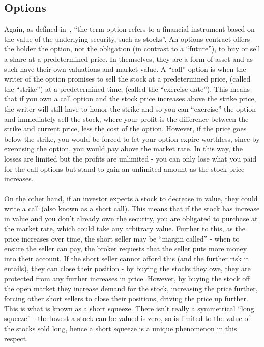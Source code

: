 \documentclass[11pt]{article} %
\begin{document}
\subsection{Options}
Again, as defined in~\cite{options}, ``the term option refers to a 
financial instrument based on the value of the underlying security, 
such as stocks''. An options contract offers the holder the option, 
not the obligation (in contrast to a ``future''), to buy or sell a share 
at a predetermined price. In themselves, they are a form of asset and 
as such have their own valuations and market value. A ``call'' option 
is when the writer of the option promises to sell the stock at a 
predetermined price, (called the ``strike'') at a predetermined time, 
(called the ``exercise date''). This means that if you own a call option and 
the stock price increases above the strike price, the writer will still have 
to honor the strike and so you can ``exercise'' the option 
and immediately sell the stock, where your profit is the difference 
between the strike and current price, less the cost of the option. 
However, if the price goes below the strike, you would be forced 
to let your option expire worthless, since by exercising the option, 
you would pay above the market rate. In this way, the losses are limited 
but the profits are unlimited - you can only lose what you paid for the 
call options but stand to gain an unlimited amount as the stock price 
increases. 
\paragraph{}
On the other hand, if an investor expects a stock to decrease 
in value, they could write a call (also known as a short call). This 
means that if the stock has increase in value and you don't already own 
the security, you are obligated to purchase at the market rate, which 
could take any arbitrary value. Further to this, as the price increases 
over time, the short seller may be ``margin called'' - when to ensure the 
seller can pay, the broker requests that the seller puts more money into 
their account. If the short seller cannot afford this (and the further 
risk it entails), they can close their position - by buying the stocks 
they owe, they are protected from any further increases in price. However, 
by buying the stock off the open market they increase demand for the 
stock, increasing the price further, forcing other short sellers to 
close their positions, driving the price up further. This is what is 
known as a short squeeze. There isn't really a symmetrical ``long 
squeeze'' - the lowest a stock can be valued is zero, so is limited to the 
value of the stocks sold long, hence a short squeeze is a unique phenomenon in 
this respect.
\end{document}
